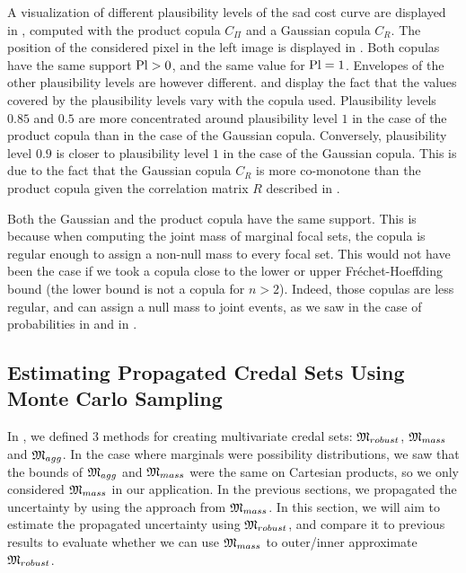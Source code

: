 A visualization of different plausibility levels of the \acrshort{sad} cost curve are displayed in , computed with the product copula $C_\Pi$ and a Gaussian copula $C_R$. The position of the considered pixel in the left image is displayed in . Both copulas have the same support $\mathrm{Pl}>0$, and the same value for $\mathrm{Pl}=1$. Envelopes of the other plausibility levels are however different.  and  display the fact that the values covered by the plausibility levels vary with the copula used. Plausibility levels $0.85$ and $0.5$ are more concentrated around plausibility level $1$ in the case of the product copula than in the case of the Gaussian copula. Conversely, plausibility level $0.9$ is closer to plausibility level $1$ in the case of the Gaussian copula. This is due to the fact that the Gaussian copula $C_R$ is more co-monotone than the product copula given the correlation matrix $R$ described in .
\begin{remark}
    Both the Gaussian and the product copula have the same support. This is because when computing the joint mass of marginal focal sets, the copula is regular enough to assign a non-null mass to every focal set. This would not have been the case if we took a copula close to the lower or upper Fréchet-Hoeffding bound (the lower bound is not a copula for $n>2$). Indeed, those copulas are less regular, and can assign a null mass to joint events, as we saw in the case of probabilities in  and in .
\end{remark}

\subsection{Estimating Propagated Credal Sets Using Monte Carlo Sampling}\label{sec:montecarlo}
In , we defined $3$ methods for creating multivariate credal sets: $\mathfrak{M}_{robust}$, $\mathfrak{M}_{mass}$ and $\mathfrak{M}_{agg}$. In the case where marginals were possibility distributions, we saw that the bounds of $\mathfrak{M}_{agg}$ and $\mathfrak{M}_{mass}$ were the same on Cartesian products, so we only considered $\mathfrak{M}_{mass}$ in our application. In the previous sections, we propagated the uncertainty by using the approach from $\mathfrak{M}_{mass}$. In this section, we will aim to estimate the propagated uncertainty using $\mathfrak{M}_{robust}$, and compare it to previous results to evaluate whether we can use $\mathfrak{M}_{mass}$ to outer/inner approximate $\mathfrak{M}_{robust}$.

